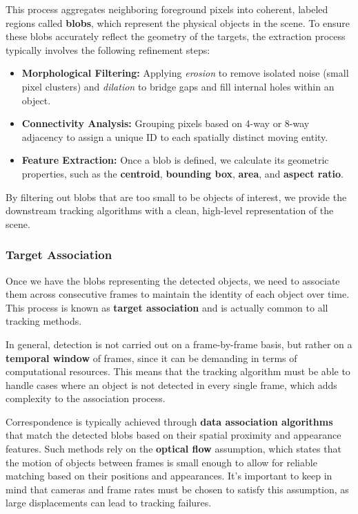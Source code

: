 This process aggregates neighboring foreground pixels into coherent, 
labeled regions called \textbf{blobs}, which represent the physical objects in the scene. 
To ensure these blobs accurately reflect the geometry of the targets, the extraction process typically involves the following refinement steps:
\begin{itemize}
    \item \textbf{Morphological Filtering:} Applying \textit{erosion} to remove isolated noise (small pixel clusters) and \textit{dilation} to bridge gaps and fill internal holes within an object.
    \item \textbf{Connectivity Analysis:} Grouping pixels based on 4-way or 8-way adjacency to assign a unique ID to each spatially distinct moving entity.
    \item \textbf{Feature Extraction:} Once a blob is defined, we calculate its geometric properties, such as the \textbf{centroid}, \textbf{bounding box}, \textbf{area}, and \textbf{aspect ratio}.
\end{itemize}
By filtering out blobs that are too small to be objects of interest, we provide the downstream tracking algorithms with a clean, high-level representation of the scene.

\subsubsection{Target Association}
Once we have the blobs representing the detected objects, we need to associate them across consecutive frames to maintain the identity of each object over time.
This process is known as \textbf{target association} and is actually common to all tracking methods.

In general, detection is not carried out on a frame-by-frame basis, but rather on a \textbf{temporal window} of frames, since it can
be demanding in terms of computational resources. 
This means that the tracking algorithm must be able to handle cases where an object is not detected in every single frame, which adds complexity to the association process.

Correspondence is typically achieved through \textbf{data association algorithms} that match the detected blobs based on their spatial proximity and appearance features.
Such methods rely on the \textbf{optical flow} assumption, which states that the motion of objects between frames is small enough to allow for reliable matching based on their positions and appearances. 
It's important to keep in mind that cameras and frame rates must be chosen to satisfy this assumption, as large displacements can lead to tracking failures.

